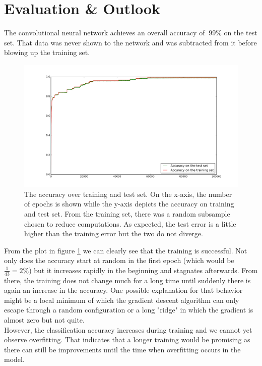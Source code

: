 \documentclass[11pt,a4paper]{article}
\begin{document}
\section{Evaluation \& Outlook}
The convolutional neural network achieves an overall accuracy of $~99 \%$ on the test set. That data was never shown to the network and was subtracted from it before blowing up the training set.\\
\begin{figure}[h!]
	\includegraphics[width=\textwidth]{accuracy.png}
	\centering
	\caption[Accuracy]{The accuracy over training and test set. On the x-axis, the number of epochs is shown while the y-axis depicts the accuracy on training and test set. From the training set, there was a random subsample chosen to reduce computations. As expected, the test error is a little higher than the training error but the two do not diverge.
}
	\label{fig:accuracy}
\end{figure}
From the plot in figure \ref{fig:accuracy} we can clearly see that the training is successful. Not only does the accuracy start at random in the first epoch (which would be $\frac{1}{43} = 2 \%$) but it increases rapidly in the beginning and stagnates afterwards. From there, the training does not change much for a long time until suddenly there is again an increase in the accuracy. One possible explanation for that behavior might be a local minimum of which the gradient descent algorithm can only escape through a random configuration or a long "ridge" in which the gradient is almost zero but not quite.\\
However, the classification accuracy increases during training and we cannot yet observe overfitting. That indicates that a longer training would be promising as there can still be improvements until the time when overfitting occurs in the model.
\end{document}

